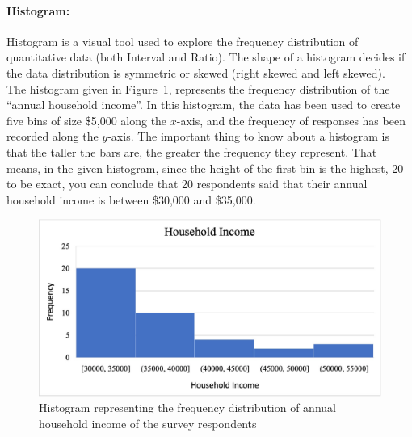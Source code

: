 \documentclass[a4paper, 11pt]{article}
\begin{document}
	\paragraph{Histogram:} Histogram is a visual tool used to explore the frequency distribution of quantitative data (both Interval and Ratio). The shape of a histogram decides if the data distribution is symmetric or skewed (right skewed and left skewed).\\[1ex]
	The histogram given in Figure~\ref{fig:Hist}, represents the frequency distribution of the “annual household income”. In this histogram, the data has been used to create five bins of size \$5,000 along the $x$-axis, and the frequency of responses has been recorded along the $y$-axis. The important thing to know about a histogram is that the taller the bars are, the greater the frequency they represent. That means, in the given histogram, since the height of the first bin is the highest, 20 to be exact, you can conclude that 20 respondents said that their annual household income is between \$30,000 and \$35,000. 
	\begin{figure}[h!]
		\includegraphics[width=\linewidth]{Hist_new.jpg}
		\caption{Histogram representing the frequency distribution of annual household income of the survey respondents}
		\label{fig:Hist}
	\end{figure}
\end{document}
